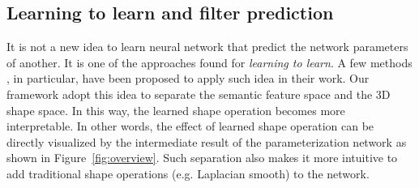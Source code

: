 \subsection{Learning to learn and filter prediction}
It is not a new idea to learn neural network that predict the network parameters of another. It is one of the approaches found for \textit{learning to learn}. A few methods \cite{schmidhuber1992learning,bertinetto2016learning,jia2016dynamic} , in particular, have been proposed to apply such idea in their work. Our framework adopt this idea to separate the semantic feature space and the 3D shape space. In this way, the learned shape operation becomes more interpretable. In other words, the effect of learned shape operation can be directly visualized by the intermediate result of the parameterization network as shown in Figure~\ref{fig:overview}. Such separation also makes it more intuitive to add traditional shape operations (e.g. Laplacian smooth) to the network. 
